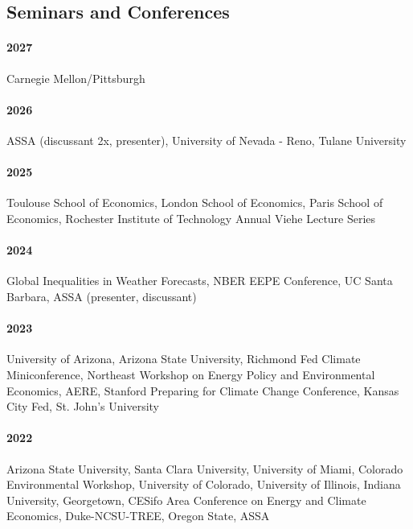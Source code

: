 \documentclass[11pt]{res} %
\begin{document}
\begin{resume}
\vspace{-.2in}

\subsection{Seminars and Conferences}\vspace{-.1in}
\paragraph{2027} Carnegie Mellon/Pittsburgh \vspace{-.3in}
\paragraph{2026} ASSA (discussant 2x, presenter), University of Nevada - Reno, Tulane University \vspace{-.3in}
\paragraph{2025} Toulouse School of Economics, London School of Economics, Paris School of Economics, Rochester Institute of Technology Annual Viehe Lecture Series \vspace{-.3in}
\paragraph{2024} Global Inequalities in Weather Forecasts, NBER EEPE Conference, UC Santa Barbara, ASSA (presenter, discussant) \vspace{-.3in}
\paragraph{2023} University of Arizona, Arizona State University, Richmond Fed Climate Miniconference, Northeast Workshop on Energy Policy and Environmental Economics, AERE, Stanford Preparing for Climate Change Conference, Kansas City Fed, St. John's University \vspace{-.3in}
\paragraph{2022} Arizona State University, Santa Clara University, University of Miami, Colorado Environmental Workshop, University of Colorado, University of Illinois, Indiana University, Georgetown, CESifo Area Conference on Energy and Climate Economics, Duke-NCSU-TREE, Oregon State, ASSA \vspace{-.3in}

\end{resume}
\end{document}
